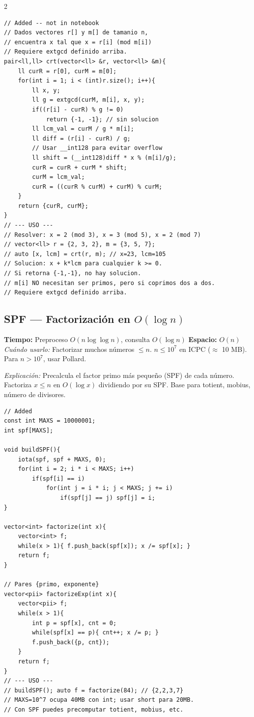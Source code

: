 \documentclass[10pt,a4paper]{article}
\begin{document}
\begin{multicols}{2}
\begin{lstlisting}
// Added -- not in notebook
// Dados vectores r[] y m[] de tamanio n,
// encuentra x tal que x = r[i] (mod m[i])
// Requiere extgcd definido arriba.
pair<ll,ll> crt(vector<ll> &r, vector<ll> &m){
    ll curR = r[0], curM = m[0];
    for(int i = 1; i < (int)r.size(); i++){
        ll x, y;
        ll g = extgcd(curM, m[i], x, y);
        if((r[i] - curR) % g != 0)
            return {-1, -1}; // sin solucion
        ll lcm_val = curM / g * m[i];
        ll diff = (r[i] - curR) / g;
        // Usar __int128 para evitar overflow
        ll shift = (__int128)diff * x % (m[i]/g);
        curR = curR + curM * shift;
        curM = lcm_val;
        curR = ((curR % curM) + curM) % curM;
    }
    return {curR, curM};
}
// --- USO ---
// Resolver: x = 2 (mod 3), x = 3 (mod 5), x = 2 (mod 7)
// vector<ll> r = {2, 3, 2}, m = {3, 5, 7};
// auto [x, lcm] = crt(r, m); // x=23, lcm=105
// Solucion: x + k*lcm para cualquier k >= 0.
// Si retorna {-1,-1}, no hay solucion.
// m[i] NO necesitan ser primos, pero si coprimos dos a dos.
// Requiere extgcd definido arriba.
\end{lstlisting}

\subsection{SPF — Factorizaci\'on en $O(\log n)$}
\textbf{Tiempo:} Preproceso $O(n \log \log n)$, consulta $O(\log n)$ \quad \textbf{Espacio:} $O(n)$\\
\textit{Cu\'ando usarlo:} Factorizar muchos n\'umeros $\leq n$. $n \leq 10^7$ en ICPC ($\approx$ 10 MB). Para $n > 10^7$, usar Pollard.

\textit{Explicaci\'on:} Precalcula el factor primo m\'as peque\~no (SPF) de cada n\'umero. Factoriza $x \leq n$ en $O(\log x)$ dividiendo por su SPF. Base para totient, mobius, n\'umero de divisores.

\begin{lstlisting}
// Added
const int MAXS = 10000001;
int spf[MAXS];

void buildSPF(){
    iota(spf, spf + MAXS, 0);
    for(int i = 2; i * i < MAXS; i++)
        if(spf[i] == i)
            for(int j = i * i; j < MAXS; j += i)
                if(spf[j] == j) spf[j] = i;
}

vector<int> factorize(int x){
    vector<int> f;
    while(x > 1){ f.push_back(spf[x]); x /= spf[x]; }
    return f;
}

// Pares {primo, exponente}
vector<pii> factorizeExp(int x){
    vector<pii> f;
    while(x > 1){
        int p = spf[x], cnt = 0;
        while(spf[x] == p){ cnt++; x /= p; }
        f.push_back({p, cnt});
    }
    return f;
}
// --- USO ---
// buildSPF(); auto f = factorize(84); // {2,2,3,7}
// MAXS=10^7 ocupa 40MB con int; usar short para 20MB.
// Con SPF puedes precomputar totient, mobius, etc.
\end{lstlisting}


\end{multicols}
\end{document}
